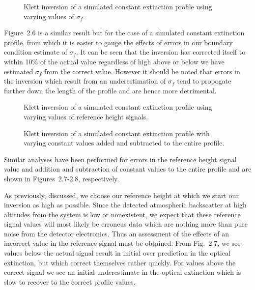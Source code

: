 \begin{figure}
\vspace{5.0in}
\caption{Klett inversion of a simulated
constant extinction profile using varying values
of $\sigma_{f}$.}
\end{figure}

Figure~{2.6} is a similar result but for the case of a simulated
constant extinction profile, from which it is easier to gauge
the effects of errors in our boundary condition estimate of
$\sigma_{f}$. It can be seen that the inversion has corrected itself to within
10\% of the actual value regardless of high above or below we
have estimated $\sigma_{f}$ from the correct value. However
it should be noted that errors in the inversion which result from
an underestimation of $\sigma_{f}$ tend to propogate further
down the length of the profile and are hence more detrimental. 

\begin{figure}
\vspace{5.0in}
\caption{Klett inversion of a simulated
constant extinction profile using varying values
of reference height signals.}
\end{figure}

\begin{figure}
\vspace{5.0in}
\caption{Klett inversion of a simulated
constant extinction profile with varying
constant values added and subtracted to the entire profile.}
\end{figure}

Similar analyses have been performed for errors in the reference
height signal value and addition and subtraction of constant values
to the entire profile and are shown in Figures~{2.7-2.8}, respectively.

As previously, discussed, we choose our reference 
height at which we start our inversion as high as possible.
Since the detected atmospheric backscatter at high altitudes from 
the system is low or nonexistent, we expect that these reference 
signal values will most likely be erroneus data which are nothing
more than pure noise from the detector electronics. Thus an
assessment of the effects of an incorrect value in the reference
signal must be obtained. From Fig.~{2.7}, we see values below
the actual signal result in initial over prediction in the optical
extinction, but which correct themselves rather quickly.
For values above the correct signal we see an initial underestimate
in the optical extinction which is slow to recover to the correct 
profile values.

